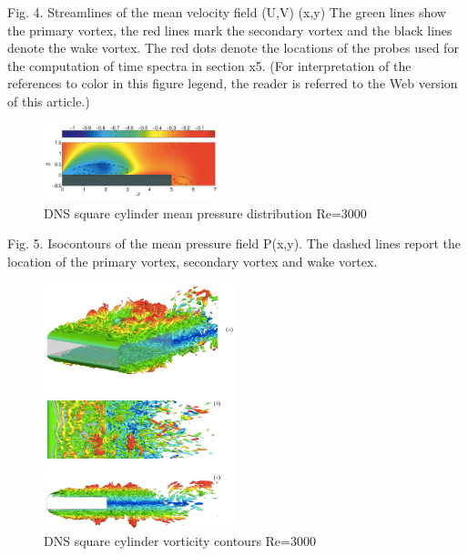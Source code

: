 \documentclass[journal]{new-aiaa}
\begin{document}
Fig. 4. Streamlines of the mean velocity field (U,V) (x,y)  The green lines show the primary vortex, the red lines mark the secondary vortex and the black lines denote the wake vortex. The red dots denote the locations of the probes used for the computation of time spectra in section x5. (For interpretation of the references to color in this figure legend, the reader is referred to the Web version of this article.)

\begin{figure}[H]
\begin{center}
\includegraphics[width=0.45\textwidth]{Images/logan/cimarelli2018direct_pressure.pdf}
\caption{ DNS square cylinder mean pressure distribution Re=3000 \cite{cimarelli2018direct} }
\label{fig:dnsRectCylPressure}
\end{center}
\end{figure}

Fig. 5. Isocontours of the mean pressure field P(x,y). The dashed lines report the location of the primary vortex, secondary vortex and wake vortex.


\begin{figure}[H]
\begin{center}
\includegraphics[width=0.5\textwidth]{Images/logan/cimarelli2018direct_vorticity.pdf}
\caption{ DNS square cylinder vorticity contours Re=3000 \cite{cimarelli2018direct} }
\label{fig:dnsRectCylPressure}
\end{center}
\end{figure}
\end{document}
